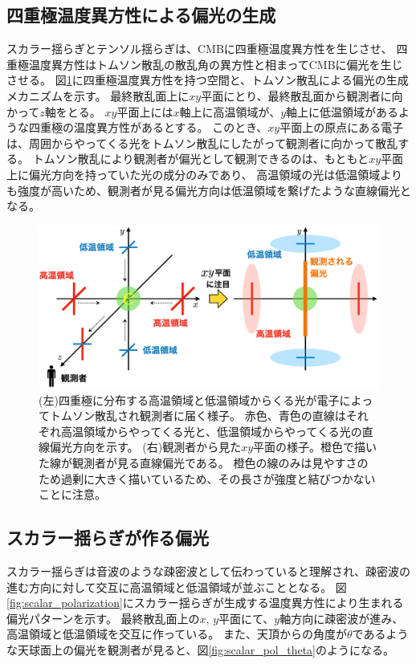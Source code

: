 \documentclass[../../main.tex]{subfiles}
\begin{document}
\subsection{四重極温度異方性による偏光の生成}
スカラー揺らぎとテンソル揺らぎは、CMBに四重極温度異方性を生じさせ、
四重極温度異方性はトムソン散乱の散乱角の異方性と相まってCMBに偏光を生じさせる。
図\ref{fig:thomson_polarization}に四重極温度異方性を持つ空間と、トムソン散乱による偏光の生成メカニズムを示す。
最終散乱面上に$xy$平面にとり、最終散乱面から観測者に向かって$z$軸をとる。
$xy$平面上には$x$軸上に高温領域が、$y$軸上に低温領域があるような四重極の温度異方性があるとする。
このとき、$xy$平面上の原点にある電子は、周囲からやってくる光をトムソン散乱にしたがって観測者に向かって散乱する。
トムソン散乱により観測者が偏光として観測できるのは、もともと$xy$平面上に偏光方向を持っていた光の成分のみであり、
高温領域の光は低温領域よりも強度が高いため、観測者が見る偏光方向は低温領域を繋げたような直線偏光となる。
\begin{figure}[H]
    \centering
    \includegraphics[width=1.0\textwidth]{intro/thomson_polarization.pdf}
    \caption{(左)四重極に分布する高温領域と低温領域からくる光が電子によってトムソン散乱され観測者に届く様子。
    赤色、青色の直線はそれぞれ高温領域からやってくる光と、低温領域からやってくる光の直線偏光方向を示す。
    (右)観測者から見た$xy$平面の様子。橙色で描いた線が観測者が見る直線偏光である。
    橙色の線のみは見やすさのため過剰に大きく描いているため、その長さが強度と結びつかないことに注意。}
    \label{fig:thomson_polarization}
\end{figure}

\subsection{スカラー揺らぎが作る偏光}
スカラー揺らぎは音波のような疎密波として伝わっていると理解され、疎密波の進む方向に対して交互に高温領域と低温領域が並ぶこととなる。
図\ref{fig:scalar_polarization}にスカラー揺らぎが生成する温度異方性により生まれる偏光パターンを示す。
最終散乱面上の$x,\,y$平面にて、$y$軸方向に疎密波が進み、高温領域と低温領域を交互に作っている。
また、天頂からの角度が$\theta$であるような天球面上の偏光を観測者が見ると、図\ref{fig:scalar_pol_theta}のようになる。
\end{document}
